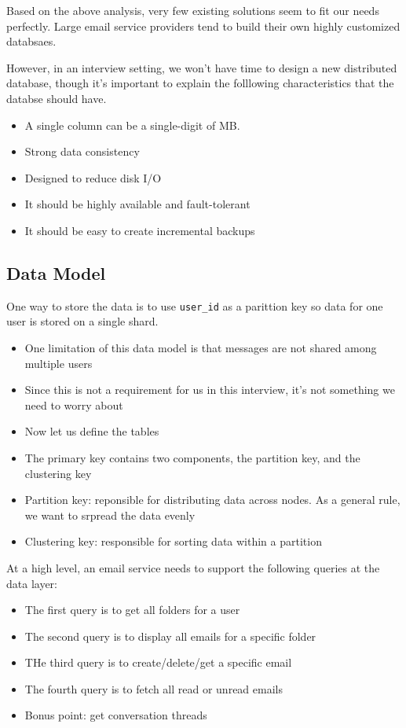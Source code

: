 \documentclass{report}
\theoremstyle{definition}
\let\oldsubsection\subsection
\renewcommand{\subsection}{\oldsubsection*}
\begin{document}
Based on the above analysis, very few existing solutions seem to fit our needs perfectly. Large email service providers tend to build their own highly customized databsaes.

However, in an interview setting, we won't have time to design a new distributed database,  though it's important to explain the folllowing characteristics that the databse should have.

\begin{itemize}
\item
A single column can be a single-digit of MB.
\item
Strong data consistency
\item
Designed to reduce disk I/O
\item
It should be highly available and fault-tolerant
\item
It should be easy to create incremental backups
\end{itemize}

\subsection{Data Model}

One way to store the data is to use \lstinline|user_id| as a parittion key so data for one user is stored on a single shard.

\begin{itemize}
\item
One limitation of this data model is that messages are not shared among multiple users
\item
Since this is not a requirement for us in this interview, it's not something we need to worry about
\item
Now let us define the tables
\item
The primary key contains two components, the partition key, and the clustering key
\item
Partition key: reponsible for distributing data across nodes. As a general rule, we want to srpread the data evenly
\item
Clustering key: responsible for sorting data within a partition
\end{itemize}

At a high level, an email service needs to support the following queries at the data layer:

\begin{itemize}
\item
The first query is to get all folders for a user
\item
The second query is to display all emails for a specific folder
\item
THe third query is to create/delete/get a specific email
\item
The fourth query is to fetch all read or unread emails
\item
Bonus point: get conversation threads
\end{itemize}
\end{document}
